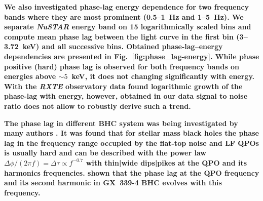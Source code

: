 \documentclass[a4paper,fleqn,usenatbib]{mnras}
\begin{document}
{\bf 
We also investigated phase-lag energy dependence for two frequency bands where they are most prominent (0.5--1~Hz and 1--5~Hz). 
We separate {\it NuSTAR} energy band on 15 logarithmically scaled bins and compute mean phase lag between the light curve in the first bin (3--3.72~keV) and all successive bins.
Obtained phase-lag--energy dependencies are presented in Fig.~\ref{fig:phase_lag-energy}.
While phase positive (hard) phase lag is observed for both frequency bands on energies above $\sim5$~keV, it does not changing significantly with energy. 
With the {\it RXTE} observatory data \citet{2001MNRAS.327..799K} found logarithmic growth of the phase-lag with energy, however, obtained in our data signal to noise ratio does not allow to robustly derive such a trend. 
}

{\bf 
The phase lag in different BHC system was being investigated by many authors \citep[see, e.g.][]{1997ApJ...474L..43V, 2003A&A...407..335M, 2006A&A...449..703R, 2010MNRAS.407.2166G, 2011A&A...533A...8B, 2011MNRAS.415..292M, 2012MNRAS.427.2985C, 2013MNRAS.435.2132M, 2017MNRAS.465.1926Y, 2017MNRAS.471.1475D, 2017ApJ...845..143Z, 2017MNRAS.464.2643V, 2018MNRAS.473.4644R}.
It was found that for stellar mass black holes the phase lag in the frequency range occupied by the flat-top noise and LF QPOs is usually hard and can be described with the power law $\Delta \phi /(2\pi f) = \Delta \tau \propto f^{-0.7}$ with thin|wide dips|pikes at the QPO and its harmonics frequencies. 
\citet{2017ApJ...845..143Z} shown that the phase lag at the QPO frequency and its second harmonic in GX~339-4 BHC evolves with this frequency. 

}
\end{document}
